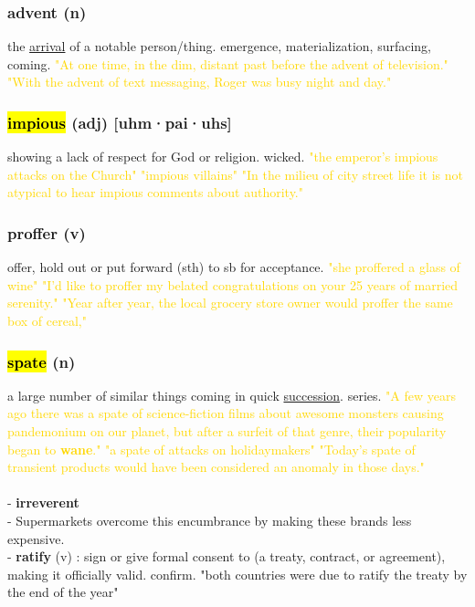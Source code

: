 \documentclass{proc}
\begin{document}
	\subsubsection{\textcolor{brickred}{advent} (n)}
	the \underline{arrival} of a notable person/thing. emergence, materialization, surfacing, coming.
	\textcolor{gold}{"At one time, in the dim, distant past before the advent of television." "With the advent of text messaging, Roger was busy night and day."}
	
	\subsubsection{\textcolor{brickred}{\hl{impious}} (adj) [uhm·pai·uhs]}
	showing a lack of respect for God or religion. wicked.
	\textcolor{gold}{"the emperor's impious attacks on the Church" "impious villains" "In the milieu of city street life it is not atypical to hear impious comments about authority."}
	
	\subsubsection{\textcolor{brickred}{proffer} (v)}
	offer, hold out or put forward (sth) to sb for acceptance.
	\textcolor{gold}{"she proffered a glass of wine" "I'd like to proffer my belated congratulations on your 25 years of married serenity." "Year after year, the local grocery store owner would proffer the same box of cereal,"}
	
	\subsubsection{\textcolor{brickred}{\hl{spate}} (n)}
	a large number of similar things coming in quick \underline{succession}. series.
	\textcolor{gold}{"A few years ago there was a spate of science-fiction films about awesome monsters causing pandemonium on our planet, but after a surfeit of that genre, their popularity began to \textbf{wane}." "a spate of attacks on holidaymakers" "Today's spate of transient products would have been considered an anomaly in those days."}\\\\
	- \textbf{irreverent}\\
	- Supermarkets overcome this encumbrance by making these brands less expensive.\\
	- \textbf{ratify} (v) : sign or give formal consent to (a treaty, contract, or agreement), making it officially valid. confirm. "both countries were due to ratify the treaty by the end of the year"
	
\end{document}

